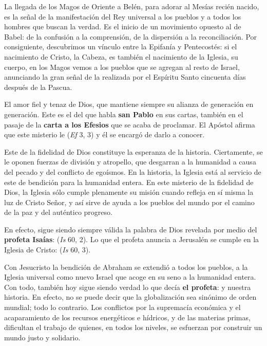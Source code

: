 \begin{body}
					La llegada de los Magos de Oriente a Belén, para adorar al Mesías recién nacido, es la señal de la manifestación del Rey universal a los pueblos y a todos los hombres que buscan la verdad. Es el inicio de un movimiento opuesto al de Babel: de la confusión a la comprensión, de la dispersión a la reconciliación. Por consiguiente, descubrimos un vínculo entre la Epifanía y Pentecostés: si el nacimiento de Cristo, la Cabeza, es también el nacimiento de la Iglesia, su cuerpo, en los Magos vemos a los pueblos que se agregan al resto de Israel, anunciando la gran señal de la  realizada por el Espíritu Santo cincuenta días después de la Pascua.
					
					El amor fiel y tenaz de Dios, que mantiene siempre su alianza de generación en generación. Este es el  del que habla \textbf{san Pablo} en sus cartas, también en el pasaje de la \textbf{carta a los Efesios} que se acaba de proclamar. El Apóstol afirma que este misterio le  (\emph{Ef} 3, 3) y él se encargó de darlo a conocer.
					
					Este  de la fidelidad de Dios constituye la esperanza de la historia. Ciertamente, se le oponen fuerzas de división y atropello, que desgarran a la humanidad a causa del pecado y del conflicto de egoísmos. En la historia, la Iglesia está al servicio de este  de bendición para la humanidad entera. En este misterio de la fidelidad de Dios, la Iglesia sólo cumple plenamente su misión cuando refleja en sí misma la luz de Cristo Señor, y así sirve de ayuda a los pueblos del mundo por el camino de la paz y del auténtico progreso.
					
					En efecto, sigue siendo siempre válida la palabra de Dios revelada por medio del \textbf{profeta Isaías}:  (\emph{Is} 60, 2). Lo que el profeta anuncia a Jerusalén se cumple en la Iglesia de Cristo:  (\emph{Is} 60, 3).
					
					Con Jesucristo la bendición de Abraham se extendió a todos los pueblos, a la Iglesia universal como nuevo Israel que acoge en su seno a la humanidad entera. Con todo, también hoy sigue siendo verdad lo que decía \textbf{el profeta}:  y nuestra historia. En efecto, no se puede decir que la globalización sea sinónimo de orden mundial; todo lo contrario. Los conflictos por la supremacía económica y el acaparamiento de los recursos energéticos e hídricos, y de las materias primas, dificultan el trabajo de quienes, en todos los niveles, se esfuerzan por construir un mundo justo y solidario.
					

\end{body}
